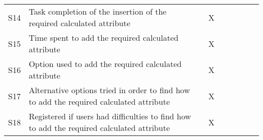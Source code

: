 \begin{longtable}{@{}lm{7cm}ccccccc@{}}
    S14         & Task completion of the insertion of the required calculated attribute                                                                                   &                                                & X                                              &                                                &                                                &                                                &                                                &                                                \\
    S15         & Time spent to add the required calculated attribute                                                                                                     &                                                & X                                              &                                                &                                                &                                                &                                                &                                                \\
    S16         & Option used to add the required calculated attribute                                                                                                    &                                                & X                                              &                                                &                                                &                                                &                                                &                                                \\
    S17         & Alternative options tried in order to find how to add the required calculated attribute                                                                 &                                                & X                                              &                                                &                                                &                                                &                                                &                                                \\
    S18         & Registered if users had difficulties to find how to add the required calculated attribute                                                               &                                                & X                                              &                                                &                                                &                                                &                                                &                                                \\

\end{longtable}
